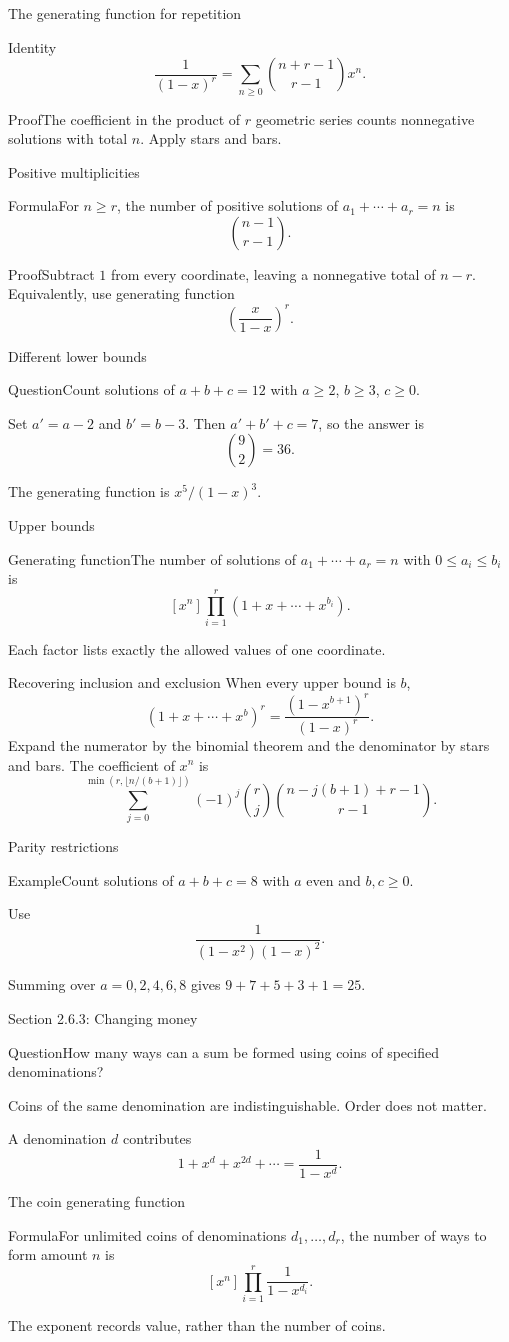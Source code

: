 \documentclass[aspectratio=169,11pt]{beamer}
\newcommand{\Thm}[2]{\begin{block}{#1}#2\end{block}}
\renewcommand{\Proof}[1]{\begin{block}{Proof}\normalsize #1\end{block}}
\newcommand{\Question}[1]{\begin{block}{Question}#1\end{block}}
\renewcommand{\Example}[1]{\begin{block}{Example}#1\end{block}}
\newcommand{\gap}{\par\medskip}
\begin{document}
\begin{frame}{The generating function for repetition}
\large
\Thm{Identity}{\[\frac1{(1-x)^r}=\sum_{n\geq0}\binom{n+r-1}{r-1}x^n.\]}
\Proof{The coefficient in the product of $r$ geometric series counts nonnegative solutions with total $n$. Apply stars and bars.}
\end{frame}
\begin{frame}{Positive multiplicities}
\large
\Thm{Formula}{For $n\geq r$, the number of positive solutions of $a_1+\cdots+a_r=n$ is
\[\binom{n-1}{r-1}.\]}
\Proof{Subtract $1$ from every coordinate, leaving a nonnegative total of $n-r$. Equivalently, use generating function
\[\left(\frac{x}{1-x}\right)^r.\]}
\end{frame}
\begin{frame}{Different lower bounds}
\large
\Question{Count solutions of $a+b+c=12$ with $a\geq2$, $b\geq3$, $c\geq0$.}
\gap Set $a'=a-2$ and $b'=b-3$. Then $a'+b'+c=7$, so the answer is
\[\binom92=36.\]
\gap The generating function is $x^5/(1-x)^3$.
\end{frame}
\begin{frame}{Upper bounds}
\large
\Thm{Generating function}{The number of solutions of $a_1+\cdots+a_r=n$ with $0\leq a_i\leq b_i$ is
\[[x^n]\prod_{i=1}^r(1+x+\cdots+x^{b_i}).\]}
\gap Each factor lists exactly the allowed values of one coordinate.
\end{frame}
\begin{frame}{Recovering inclusion and exclusion}
\large
When every upper bound is $b$,
\[(1+x+\cdots+x^b)^r=\frac{(1-x^{b+1})^r}{(1-x)^r}.\]
Expand the numerator by the binomial theorem and the denominator by stars and bars. The coefficient of $x^n$ is
\[\sum_{j=0}^{\min(r,\lfloor n/(b+1)\rfloor)}(-1)^j\binom rj
\binom{n-j(b+1)+r-1}{r-1}.\]
\end{frame}
\begin{frame}{Parity restrictions}
\large
\Example{Count solutions of $a+b+c=8$ with $a$ even and $b,c\geq0$.}
\gap Use
\[\frac1{(1-x^2)(1-x)^2}.\]
\gap Summing over $a=0,2,4,6,8$ gives $9+7+5+3+1=25$.
\end{frame}
\begin{frame}{Section 2.6.3: Changing money}
\large
\Question{How many ways can a sum be formed using coins of specified denominations?}
\gap Coins of the same denomination are indistinguishable. Order does not matter.
\gap A denomination $d$ contributes
\[1+x^d+x^{2d}+\cdots=\frac1{1-x^d}.\]
\end{frame}
\begin{frame}{The coin generating function}
\large
\Thm{Formula}{For unlimited coins of denominations $d_1,\ldots,d_r$, the number of ways to form amount $n$ is
\[[x^n]\prod_{i=1}^r\frac1{1-x^{d_i}}.\]}
\gap The exponent records value, rather than the number of coins.
\end{frame}
\end{document}
